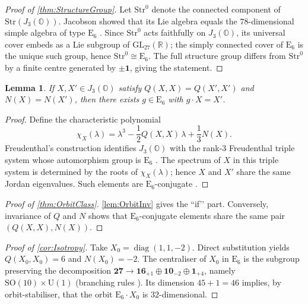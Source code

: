 \documentclass[pdflatex,sn-mathphys-num]{sn-jnl}
\theoremstyle{thmstyleone}
\newtheorem{lemma}[lemma]{Lemma}
\theoremstyle{thmstyletwo}%
\theoremstyle{thmstylethree}%
\newcommand{\SO}[1]{\mathrm{SO(#1)}}
\newcommand{\U}[1]{\mathrm{U(#1)}}
\newcommand{\E}[1]{\mathrm{E_{#1}}}
\newcommand{\SOTen}{\SO{10}}
\newcommand{\UOne}{\U{1}}
\newcommand{\ESix}{\E{6}}
\begin{document}
\begin{appendices}
\begin{proof}[Proof of \autoref{thm:StructureGroup}]
Let $\mathrm{Str}^{0}$ denote the connected component of
$\mathrm{Str}(J_{3}(\mathbb{O}))$.  Jacobson showed that its Lie algebra
equals the $78$-dimensional simple algebra of type $\ESix$
\cite{Jacobson:1968}. Since $\mathrm{Str}^{0}$ acts faithfully on
$J_{3}(\mathbb{O})$, its universal cover embeds as a Lie subgroup of
$\mathrm{GL}_{27}(\mathbb R)$; the simply connected cover of $\ESix$ is
the unique such group, hence $\mathrm{Str}^{0}\cong \ESix$. The full structure group differs from $\mathrm{Str}^{0}$ by a finite centre generated by $\pm\mathbf 1$,
giving the statement.
\end{proof}

\begin{lemma}\label{lem:OrbitInv}
If $X,X'\in J_{3}(\mathbb{O})$ satisfy
\(Q(X,X)=Q(X',X')\) and \(N(X)=N(X')\), then there exists
\(g\in \ESix\) with $g\cdot X=X'$.
\end{lemma}

\begin{proof}
Define the characteristic polynomial
\[\chi_{X}(\lambda)=\lambda^{3}-\frac12Q(X,X)\,\lambda
+\frac13N(X).\]
Freudenthal’s
construction identifies $J_{3}(\mathbb{O})$ with the rank-3
Freudenthal triple system whose automorphism group is $\ESix$
\cite{Springer:2000}.  The spectrum of \(X\) in this triple system is
determined by the roots of $\chi_{X}(\lambda)$; hence $X$ and $X'$ share
the same Jordan eigenvalues. Such elements are $\ESix$-conjugate \cite{McCrimmon:2004}.
\end{proof}

\begin{proof}[Proof of \autoref{thm:OrbitClass}]
\autoref{lem:OrbitInv} gives the “if’’ part.
Conversely, invariance of \(Q\) and \(N\) shows that
$\ESix$-conjugate elements share the same pair
\((Q(X,X),N(X))\).
\end{proof}

\begin{proof}[Proof of \autoref{cor:Isotropy}]
Take \(X_{0}=\operatorname{diag}(1,1,-2)\).
Direct substitution yields $Q(X_{0},X_{0})=6$ and $N(X_{0})=-2$.  The
centraliser of \(X_{0}\) in $\ESix$ is the subgroup preserving the
decomposition
\(\mathbf{27} \to \mathbf{16}_{+1}\oplus\mathbf{10}_{-2}\oplus\mathbf{1}_{+4}\),
namely \(\SOTen\times \UOne\) (branching rules
\cite{Slansky:1981}).  Its dimension $45+1=46$ implies, by orbit-stabiliser,
that the orbit \(\ESix\cdot X_{0}\) is $32$-dimensional.
\end{proof}


\end{appendices}
\end{document}
